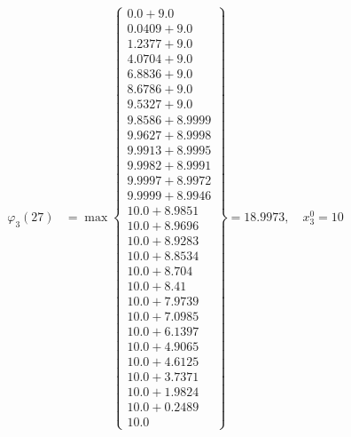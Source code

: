 \documentclass{article}
\begin{document}
\begin{align*}
\varphi_{3}(27) &= \max \left\{ \begin{array}{c}
0.0 + 9.0 \\
 0.0409 + 9.0 \\
 1.2377 + 9.0 \\
 4.0704 + 9.0 \\
 6.8836 + 9.0 \\
 8.6786 + 9.0 \\
 9.5327 + 9.0 \\
 9.8586 + 8.9999 \\
 9.9627 + 8.9998 \\
 9.9913 + 8.9995 \\
 9.9982 + 8.9991 \\
 9.9997 + 8.9972 \\
 9.9999 + 8.9946 \\
 10.0 + 8.9851 \\
 10.0 + 8.9696 \\
 10.0 + 8.9283 \\
 10.0 + 8.8534 \\
 10.0 + 8.704 \\
 10.0 + 8.41 \\
 10.0 + 7.9739 \\
 10.0 + 7.0985 \\
 10.0 + 6.1397 \\
 10.0 + 4.9065 \\
 10.0 + 4.6125 \\
 10.0 + 3.7371 \\
 10.0 + 1.9824 \\
 10.0 + 0.2489 \\
 10.0
\end{array} \right\}=18.9973, \quad x_{3}^0=10\\
  

\end{align*}
\end{document}
